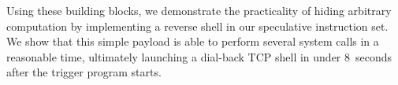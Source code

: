 Using these building blocks, we demonstrate the practicality of hiding arbitrary
computation by implementing a reverse shell in our speculative instruction set.
We show that this simple payload is able to perform several system calls
in a reasonable time, ultimately launching a dial-back TCP shell in under 8~seconds after
the trigger program starts.










